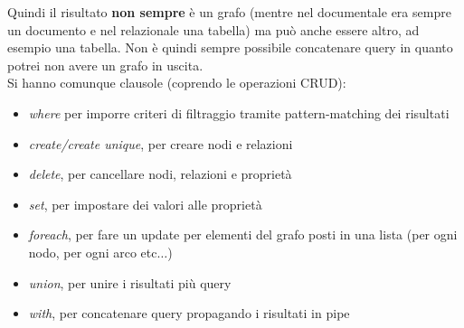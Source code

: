 \documentclass[a4paper,12pt, oneside]{book}
\begin{document}
Quindi il risultato \textbf{non sempre} è un grafo (mentre nel documentale era
sempre un documento e nel relazionale una tabella) ma può anche essere altro, ad
esempio una tabella. Non è quindi sempre possibile concatenare query in quanto
potrei non avere un grafo in uscita.\\
Si hanno comunque clausole (coprendo le operazioni CRUD):
\begin{itemize}
  \item \textit{where} per imporre criteri di filtraggio tramite
  pattern-matching dei risultati
  \item \textit{create/create unique}, per creare nodi e relazioni
  \item \textit{delete}, per cancellare nodi, relazioni e proprietà
  \item \textit{set}, per impostare dei valori alle proprietà
  \item \textit{foreach}, per fare un update per elementi del grafo posti in una
  lista (per ogni nodo, per ogni arco etc$\ldots$)
  \item \textit{union}, per unire i risultati più query
  \item \textit{with}, per concatenare query propagando i risultati in pipe
\end{itemize}
\end{document}
